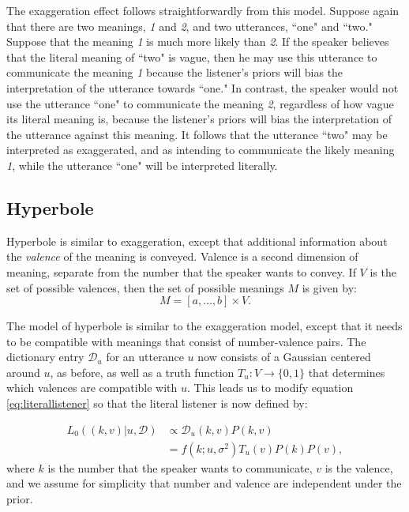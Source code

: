 \documentclass{article} %
\newcommand{\dictionary}{\ensuremath{\mathcal{D}}\xspace}
\begin{document}
The exaggeration effect follows straightforwardly from this model. Suppose again that there are two meanings, \emph{1} and \emph{2}, and two utterances, ``one" and ``two." Suppose that the meaning \emph{1} is much more likely than \emph{2}. If the speaker believes that the literal meaning of ``two" is vague, then he may use this utterance to communicate the meaning \emph{1} because the listener's priors will bias the interpretation of the utterance towards ``one." In contrast, the speaker would not use the utterance ``one" to communicate the meaning \emph{2}, regardless of how vague its literal meaning is, because the listener's priors will bias the interpretation of the utterance against this meaning. It follows that the utterance ``two" may be interpreted as exaggerated, and as intending to communicate the likely meaning \emph{1}, while the utterance ``one" will be interpreted literally.

\subsection{Hyperbole}

Hyperbole is similar to exaggeration, except that additional information about the \emph{valence} of the meaning is conveyed. Valence is a second dimension of meaning, separate from the number that the speaker wants to convey. If $V$ is the set of possible valences, then the set of possible meanings $M$ is given by:
\begin{equation}
M = [a,...,b] \times V.
\end{equation}

The model of hyperbole is similar to the exaggeration model, except that it needs to be compatible with meanings that consist of number-valence pairs. The dictionary entry $\dictionary_u$ for an utterance $u$ now consists of a Gaussian centered around $u$, as before, as well as a truth function $T_u:V\rightarrow \{0,1\}$ that determines which valences are compatible with $u$. This leads us to modify equation \ref{eq:literallistener} so that the literal listener is now defined by:

\begin{align}\label{eq:valenceliteral}
L_0((k,v) | u, \dictionary) &\propto \dictionary_u(k,v)P(k,v) \\
&=f(k;u,\sigma^2)T_u(v)P(k)P(v),
\end{align}
where $k$ is the number that the speaker wants to communicate, $v$ is the valence, and we assume for simplicity that number and valence are independent under the prior. 
\end{document}
